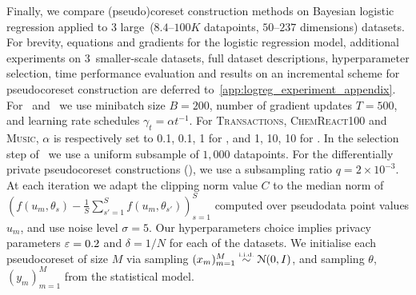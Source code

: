 Finally, we compare (pseudo)coreset construction methods on Bayesian logistic
regression applied to 3 large~($8.4$--$100K$ datapoints, $50$--$237$
dimensions) datasets. For brevity, equations and gradients for the logistic
regression model, additional experiments on \mbox{3 smaller-scale} datasets,
full dataset descriptions, hyperparameter selection, time performance
evaluation and results on an incremental scheme for pseudocoreset construction
are deferred to~\cref{app:logreg_experiment_appendix}. 
%
%
 For \psvi~and \sparsevi~we use minibatch size ${B=200}$, number of gradient
updates ${T=500}$, and learning rate schedules $ \gamma_t = \alpha t^{-1}$. For
\textsc{Transactions}, \textsc{ChemReact100} and \textsc{Music}, $\alpha$ is
respectively set to 0.1, 0.1, 1 for \sparsevi, and 1, 10, 10 for \psvi. In the
selection step of \sparsevi~we use a uniform subsample of $1,000$ datapoints.
For the differentially private pseudocoreset constructions (\dpsvi), we  use a
subsampling ratio $q=2\times10^{-3}$. At each iteration we adapt the clipping
norm value $ C $ to the median norm of $( f(u_m, \theta_s) - \frac{1}{S}
\sum_{s'=1}^{S} f(u_m, \theta_{s'}))_{s=1}^{S}$ computed
over pseudodata point values $u_m$, and use noise level $\sigma=5$. Our hyperparameters choice implies privacy parameters $\varepsilon=0.2$ and $\delta=1/N$ for each of the datasets. We
initialise each pseudocoreset of size $ M$ via sampling $(x_m)_{m=1}^{M} \distiid
\distNorm{(0, I)}$, and sampling $\theta$, $ (y_m)_{m=1}^{M} $ from the statistical
model.

